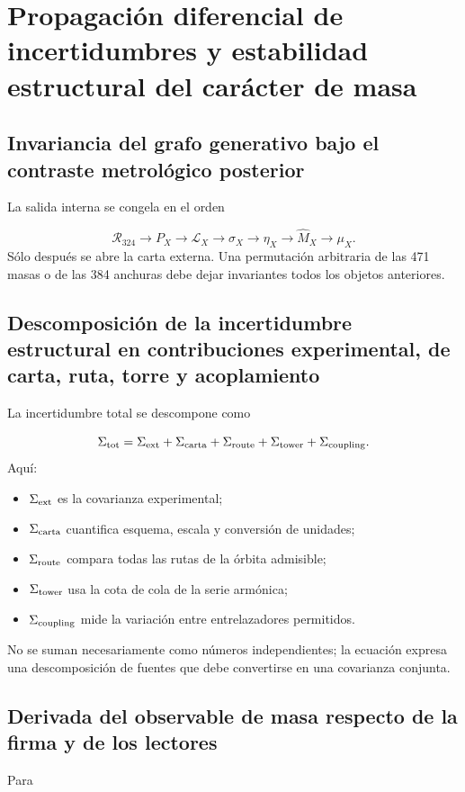 \section{Propagación diferencial de incertidumbres y estabilidad estructural del carácter de masa}
\subsection{Invariancia del grafo generativo bajo el contraste metrológico posterior}
La salida interna se congela en el orden

\[
 \mathcal R_{324}
 \to P_X
 \to\mathcal L_X
 \to\sigma_X
 \to\eta_X
 \to\widehat M_X
 \to\mu_X.
\]
Sólo después se abre la carta externa. Una permutación arbitraria de las 471 masas o de las 384 anchuras debe dejar invariantes todos los objetos anteriores.

\subsection{Descomposición de la incertidumbre estructural en contribuciones experimental, de carta, ruta, torre y acoplamiento}
La incertidumbre total se descompone como

\[
 \Sigma_{\rm tot}
 =\Sigma_{\rm ext}
 +\Sigma_{\rm carta}
 +\Sigma_{\rm route}
 +\Sigma_{\rm tower}
 +\Sigma_{\rm coupling}.
\]
Aquí:

\begin{itemize}
\item \(\Sigma_{\rm ext}\) es la covarianza experimental;
\item \(\Sigma_{\rm carta}\) cuantifica esquema, escala y conversión de unidades;
\item \(\Sigma_{\rm route}\) compara todas las rutas de la órbita admisible;
\item \(\Sigma_{\rm tower}\) usa la cota de cola de la serie armónica;
\item \(\Sigma_{\rm coupling}\) mide la variación entre entrelazadores permitidos.
\end{itemize}
No se suman necesariamente como números independientes; la ecuación expresa una descomposición de fuentes que debe convertirse en una covarianza conjunta.

\subsection{Derivada del observable de masa respecto de la firma y de los lectores}
Para

